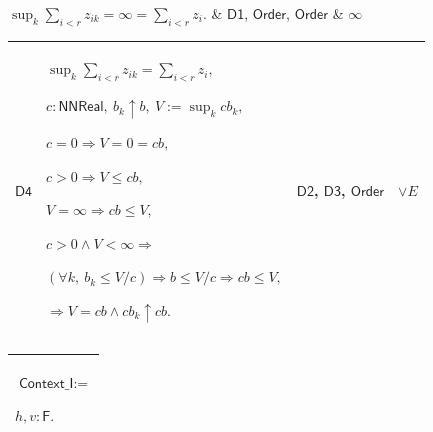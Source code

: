 \documentclass[11pt]{amsart}
\newlength{\FTCOneColumnBody}
\newlength{\FTCFourColumnBody}
\begin{document}
{\begin{tabular}
$\displaystyle \sup_k\sum_{i<r}z_{ik}=\infty=\sum_{i<r}z_i.$ & \hyperlink{proof:D1}{$\displaystyle \textsf{D1}$}, \hyperlink{lem:Order}{$\displaystyle \textsf{Order}$}, \hyperlink{ax:Order}{$\displaystyle \textsf{Order}$} & $\displaystyle \infty$\\ \hline
\end{tabular}%
\par\setlength{\parskip}{0pt}\nointerlineskip
\noindent
\begin{tabular}{|@{}>{\centering\arraybackslash}m{0.078431\FTCFourColumnBody}|>{\centering\arraybackslash}m{0.535947\FTCFourColumnBody}|>{\centering\arraybackslash}m{0.281045\FTCFourColumnBody}|>{\centering\arraybackslash}m{0.104575\FTCFourColumnBody}|}\hline
\hypertarget{proof:D4}{$\displaystyle \textsf{D4}$} & $\displaystyle \sup_k\sum_{i<r}z_{ik}=\sum_{i<r}z_i,$\par
$\displaystyle c:\textsf{NNReal},\ b_k\uparrow b,\ V:=\sup_k cb_k,$\par
$\displaystyle c=0\Rightarrow V=0=cb,$\par
$\displaystyle c>0\Rightarrow V\le cb,$\par
$\displaystyle V=\infty\Rightarrow cb\le V,$\par
$\displaystyle c>0\land V<\infty\Rightarrow$\par
$\displaystyle (\forall k,\ b_k\le V/c)\Rightarrow b\le V/c\Rightarrow cb\le V,$\par
$\displaystyle \Rightarrow V=cb\land cb_k\uparrow cb.$ & \hyperlink{proof:D2}{$\displaystyle \textsf{D2}$}, \hyperlink{proof:D3}{$\displaystyle \textsf{D3}$}, \hyperlink{ax:Order}{$\displaystyle \textsf{Order}$} & $\displaystyle \lor E$\\ \hline
\end{tabular}%
\par\setlength{\parskip}{0pt}\nointerlineskip
\noindent
\begin{tabular}{|@{}>{\centering\arraybackslash}m{\FTCOneColumnBody}|}\hline
$\displaystyle \textsf{Context\_I}:=$\par
$\displaystyle h,v:\textsf{F}.$\\ \hline
\end{tabular}%
\par\setlength{\parskip}{0pt}\nointerlineskip
\noindent
\begin{tabular}{|@{}>{\centering\arraybackslash}m{0.078431\FTCFourColumnBody}|>{\centering\arraybackslash}m{0.535947\FTCFourColumnBody}|>{\centering\arraybackslash}m{0.281045\FTCFourColumnBody}|>{\centering\arraybackslash}m{0.104575\FTCFourColumnBody}|}\hline

\end{tabular}}
\end{document}
